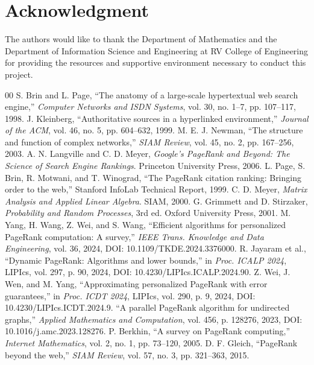 \documentclass[conference]{IEEEtran}
\begin{document}
\section*{Acknowledgment}
The authors would like to thank the Department of Mathematics and the Department of Information Science and Engineering at RV College of Engineering for providing the resources and supportive environment necessary to conduct this project.

\begin{thebibliography}{00}
 S. Brin and L. Page, ``The anatomy of a large-scale hypertextual web search engine,'' \emph{Computer Networks and ISDN Systems}, vol. 30, no. 1--7, pp. 107--117, 1998.
 J. Kleinberg, ``Authoritative sources in a hyperlinked environment,'' \emph{Journal of the ACM}, vol. 46, no. 5, pp. 604--632, 1999.
 M. E. J. Newman, ``The structure and function of complex networks,'' \emph{SIAM Review}, vol. 45, no. 2, pp. 167--256, 2003.
 A. N. Langville and C. D. Meyer, \emph{Google's PageRank and Beyond: The Science of Search Engine Rankings}. Princeton University Press, 2006.
 L. Page, S. Brin, R. Motwani, and T. Winograd, ``The PageRank citation ranking: Bringing order to the web,'' Stanford InfoLab Technical Report, 1999.
 C. D. Meyer, \emph{Matrix Analysis and Applied Linear Algebra}. SIAM, 2000.
 G. Grimmett and D. Stirzaker, \emph{Probability and Random Processes}, 3rd ed. Oxford University Press, 2001.
 M. Yang, H. Wang, Z. Wei, and S. Wang, ``Efficient algorithms for personalized PageRank computation: A survey,'' \emph{IEEE Trans. Knowledge and Data Engineering}, vol. 36, 2024, DOI: 10.1109/TKDE.2024.3376000.
 R. Jayaram et al., ``Dynamic PageRank: Algorithms and lower bounds,'' in \emph{Proc. ICALP 2024}, LIPIcs, vol. 297, p. 90, 2024, DOI: 10.4230/LIPIcs.ICALP.2024.90.
 Z. Wei, J. Wen, and M. Yang, ``Approximating personalized PageRank with error guarantees,'' in \emph{Proc. ICDT 2024}, LIPIcs, vol. 290, p. 9, 2024, DOI: 10.4230/LIPIcs.ICDT.2024.9.
 ``A parallel PageRank algorithm for undirected graphs,'' \emph{Applied Mathematics and Computation}, vol. 456, p. 128276, 2023, DOI: 10.1016/j.amc.2023.128276.
 P. Berkhin, ``A survey on PageRank computing,'' \emph{Internet Mathematics}, vol. 2, no. 1, pp. 73--120, 2005.
 D. F. Gleich, ``PageRank beyond the web,'' \emph{SIAM Review}, vol. 57, no. 3, pp. 321--363, 2015.
\end{thebibliography}
\end{document}
